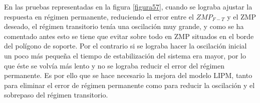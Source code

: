  

En las pruebas representadas en la figura \ref{figura57}, cuando se lograba ajustar la respuesta en régimen permanente, reduciendo el error entre el $ZMP_{F-T}$ y el ZMP deseado, el régimen transitorio tenía una oscilación muy grande, y como se ha comentado antes esto se tiene que evitar sobre todo en ZMP situados en el borde del polígono de soporte. Por el contrario si se lograba hacer la oscilación inicial un poco más pequeña el tiempo de estabilización del sistema era mayor, por lo que éste se volvía más lento y no se lograba reducir el error del régimen permanente. Es por ello que se hace necesario la mejora del modelo LIPM, tanto para eliminar el error de régimen permanente como para reducir la oscilación y el sobrepaso del régimen transitorio.

